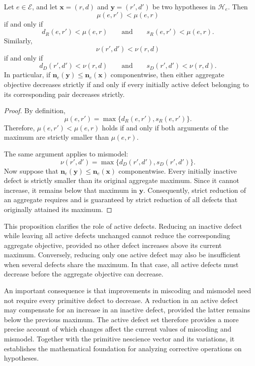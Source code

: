 \begin{proposition}
Let $e\in\mathcal E$, and let $\mathbf{x}=(r,d)$ and $\mathbf{y}=(r',d')$ be two hypotheses in $\mathcal H_e$. Then
\[
\mu(e,r')<\mu(e,r)
\]
if and only if
\[
d_R(e,r')<\mu(e,r) \qquad\text{and}\qquad s_R(e,r')<\mu(e,r).
\]
Similarly,
\[
\nu(r',d')<\nu(r,d)
\]
if and only if
\[
d_D(r',d')<\nu(r,d) \qquad\text{and}\qquad s_D(r',d')<\nu(r,d).
\]
In particular, if $\mathbf n_e(\mathbf{y})\leq\mathbf n_e(\mathbf{x})$ componentwise, then either aggregate objective decreases strictly if and only if every initially active defect belonging to its corresponding pair decreases strictly.
\end{proposition}
\begin{proof}
By definition,
\[
\mu(e,r') = \max\{d_R(e,r'),s_R(e,r')\}.
\]
Therefore, $\mu(e,r')<\mu(e,r)$ holds if and only if both arguments of the maximum are strictly smaller than $\mu(e,r)$.

The same argument applies to mismodel:
\[
\nu(r',d') = \max\{d_D(r',d'),s_D(r',d')\}.
\]
Now suppose that $\mathbf n_e(\mathbf{y})\leq\mathbf n_e(\mathbf{x})$ componentwise. Every initially inactive defect is strictly smaller than its original aggregate maximum. Since it cannot increase, it remains below that maximum in $\mathbf{y}$. Consequently, strict reduction of an aggregate requires and is guaranteed by strict reduction of all defects that originally attained its maximum.
\end{proof}

This proposition clarifies the role of active defects. Reducing an inactive defect while leaving all active
defects unchanged cannot reduce the corresponding aggregate objective, provided no other defect increases above its current maximum. Conversely, reducing only one active defect may also be insufficient when several defects share the maximum. In that case, all active defects must decrease before the aggregate objective can decrease.

An important consequence is that improvements in miscoding and mismodel need not require every primitive defect to decrease. A reduction in an active defect may compensate for an increase in an inactive defect, provided the latter remains below the previous maximum. The active defect set therefore provides a more precise account of which changes affect the current values of miscoding and mismodel. Together with the primitive nescience vector and its variations, it establishes the mathematical foundation for analyzing corrective operations on hypotheses.


